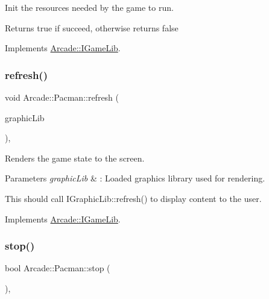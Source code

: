 Init the resources needed by the game to run. 

\begin{DoxyReturn}{Returns}
true if succeed, otherwise returns false 
\end{DoxyReturn}


Implements \hyperlink{class_arcade_1_1_i_game_lib_aacc4169a98dfeb007bcaf9dfeece9e08}{Arcade\+::\+I\+Game\+Lib}.

\mbox{\label{class_arcade_1_1_pacman_ad0d57afab410c98d4050c030b06ad63a}} 
\subsubsection{\texorpdfstring{refresh()}{refresh()}}
{\footnotesize\ttfamily void Arcade\+::\+Pacman\+::refresh (\begin{DoxyParamCaption}\item[{\hyperlink{class_arcade_1_1_i_graphic_lib}{I\+Graphic\+Lib} \&}]{graphic\+Lib }\end{DoxyParamCaption})\hspace{0.3cm}{\ttfamily [final]}, {\ttfamily [virtual]}}

Renders the game state to the screen. 
\begin{DoxyParams}{Parameters}
{\em graphic\+Lib} & \+: Loaded graphics library used for rendering.\\
\hline
\end{DoxyParams}
This should call I\+Graphic\+Lib\+::refresh() to display content to the user. 

Implements \hyperlink{class_arcade_1_1_i_game_lib_a00c3d335ef313e441217b33dcf7844df}{Arcade\+::\+I\+Game\+Lib}.

\mbox{\label{class_arcade_1_1_pacman_a2787800feab139ddeabb11d6ee23a80e}} 
\subsubsection{\texorpdfstring{stop()}{stop()}}
{\footnotesize\ttfamily bool Arcade\+::\+Pacman\+::stop (\begin{DoxyParamCaption}{ }\end{DoxyParamCaption})\hspace{0.3cm}{\ttfamily [final]}, {\ttfamily [virtual]}}




